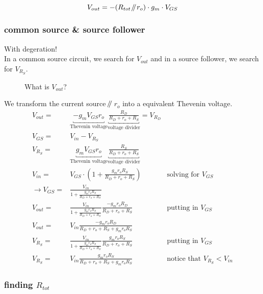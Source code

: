 \documentclass[11ypt]{extarticle}
\def \globalscale {1} %
\newcommand{\parallelEE}{\mathbin{\!/\mkern-5mu/\!}} %
\begin{document}
\begin{equation}
    V_{out} = -(R_{tot} \parallelEE r_o)\cdot g_m \cdot V_{GS}
\end{equation}
\subsubsection{common source \& source follower}
With degeration!
\\
In a common source circuit, we search for $V_{out}$ and in a source follower, we search for $V_{R_S}$.
\def \localscale {\globalscale*0.8} %

\begin{figure}[H]{} 
    \centering
    
\caption{What is $V_{out}$?}

\end{figure}

We transform the current source $\parallelEE$ $r_o$ into a equivalent Thevenin voltage.
\begin{equation}
\begin{aligned}
    V_{out} =& \underbracket{-g_m V_{GS} r_o}_\text{Thevenin voltage} \underbracket{\frac{R_D}{R_D+r_o+R_S}}_\text{voltage divider} = V_{R_D}
    \\
    V_{GS} =& V_{in} - V_{R_S} 
    \\
    V_{R_S} =& \underbracket{g_m V_{GS} r_o}_\text{Thevenin voltage} \underbracket{\frac{R_S}{R_D + r_o + R_S}}_\text{voltage divider}
    \\
    V_{in} =&  V_{GS}\cdot (1 + \frac{g_m r_o R_S}{R_D + r_o + R_S}) &\text{solving for $V_{GS}$}
    \\
    \rightarrow
    V_{GS} =& \frac{V_{in}}{1 +\frac{g_m r_o R_S}{R_D+r_o+R_S}}
    \\
    V_{out} =& \frac{V_{in}}{1 +\frac{g_m r_o R_S}{R_D+r_o+R_S}} \frac{-g_m r_o R_D}{R_D+r_o+R_S} &\text{putting in $V_{GS}$}
    \\
    V_{out} =& V_{in} \frac{-g_m r_o R_D}{R_D+r_o+R_S + g_m r_o R_S} 
    \\
    V_{R_S} =& \frac{V_{in}}{1 +\frac{g_m r_o R_S}{R_D+r_o+R_S}} \frac{g_m r_o R_{S}}{R_D+r_o+R_S} &\text{putting in $V_{GS}$}
    \\
    V_{R_S} =& V_{in} \frac{g_m r_o R_{S}}{R_D+r_o+R_S + g_m r_o R_S} &\text{notice that $V_{R_S} < V_{in}$}
\end{aligned}
\end{equation}

\subsubsection{finding $R_{tot}$}
\end{document}
